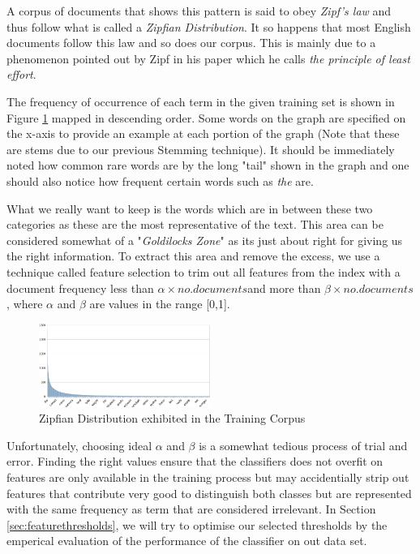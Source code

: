 A corpus of documents that shows this pattern is said to obey \emph{Zipf's law} \cite{zipf1949} and thus follow what is called a \emph{Zipfian Distribution}. It so happens that most English documents follow this law and so does our corpus. This is mainly due to a phenomenon pointed out by Zipf in his paper which he calls  \emph{the principle of least effort}.

The frequency of occurrence of each term in the given training set is shown in Figure \ref{zipfian}  mapped in descending order. Some words on the graph are specified on the x-axis to provide an example at each portion of the graph (Note that these are stems due to our previous Stemming technique). It should be immediately noted how common rare words are by the long "tail" shown in the graph and one should also notice how frequent certain words such as \emph{the} are.

What we really want to keep is the words which are in between these two categories as these are the most representative of the text. This area can be considered somewhat of a "\emph{Goldilocks Zone}" as its just about right for giving us the right information. To extract this area and remove the excess, we use a technique called feature selection to trim out all features from the index with a document frequency less than \(\alpha \times no. documents\)and more than \(\beta \times no. documents\), where \(\alpha\) and \(\beta\) are values in the range [0,1].

\begin{figure}[h!]
	\label{zipfian}
    \centering
    \includegraphics[width=0.5\textwidth]{zipfian.png}
    \caption{Zipfian Distribution exhibited in the Training Corpus}
    \label{zipfian}
\end{figure}

Unfortunately, choosing ideal \(\alpha \) and \(\beta\) is a somewhat tedious process of trial and error.
Finding the right values ensure that the classifiers does not overfit on features are only available in the training process but may accidentially strip out features that contribute very good to distinguish both classes but are represented with the same frequency as term that are considered irrelevant.
In Section \ref{sec:featurethresholds}, we will try to optimise our selected thresholds by the emperical evaluation of the performance of the classifier on out data set.

